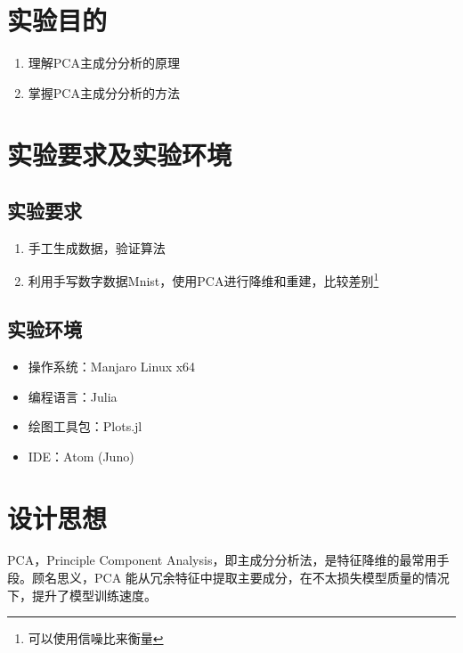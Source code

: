\documentclass{ML}
\begin{document}
\maketitle

\tableofcontents
\newpage

\section{实验目的}

\begin{enumerate}
	\item 理解PCA主成分分析的原理
	\item 掌握PCA主成分分析的方法
\end{enumerate}

\section{实验要求及实验环境}

\subsection{实验要求}

\begin{enumerate}
	\item 手工生成数据，验证算法
	\item 利用手写数字数据Mnist，使用PCA进行降维和重建，比较差别\footnote{可以使用信噪比来衡量}
\end{enumerate}

\subsection{实验环境}

\begin{itemize}
	\item 操作系统：Manjaro Linux x64
	\item 编程语言：Julia
	\item 绘图工具包：Plots.jl
	\item IDE：Atom (Juno)
\end{itemize}

\section{设计思想}

PCA，Principle Component Analysis，即主成分分析法，是特征降维的最常用手段。顾名思义，PCA 能从冗余特征中提取主要成分，在不太损失模型质量的情况下，提升了模型训练速度。
\end{document}
